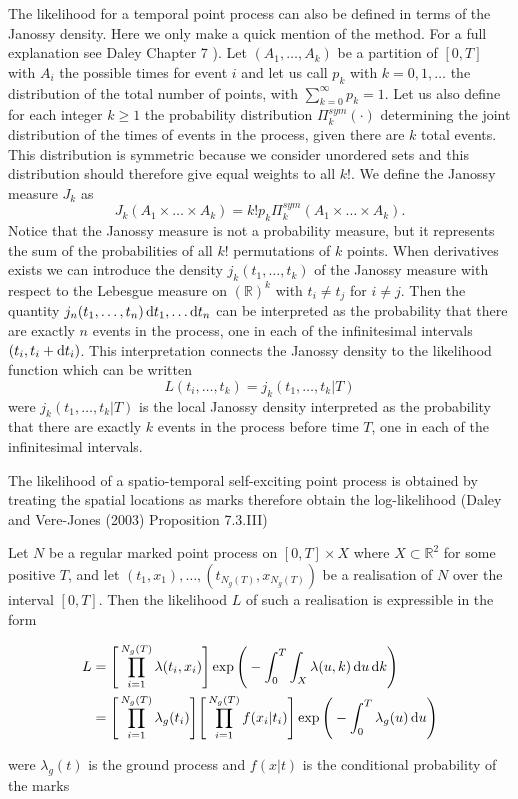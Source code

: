 The likelihood for a temporal point process can also be defined in terms of the Janossy density. Here we only make a quick mention of the method. For a full explanation see Daley Chapter 7 \cite{Daley}).
Let $(A_1, \dots, A_k)$ be a partition of $[0, T]$ with $A_i$ the possible times for event $i$ and let us call $p_k$ with $k = 0, 1, \dots$ the distribution of the total number of points, with $\sum_{k=0}^\infty p_k = 1$. Let us also define for each integer $k \geq 1$ the probability distribution $\Pi_k^{sym}(\cdot)$ determining the joint distribution of the times of events in the process, given there are $k$ total events. This distribution is symmetric because we consider unordered sets and this distribution should therefore give equal weights to all $k!$. We define the Janossy measure $J_k$ as
\begin{equation*}
    J_k(A_1 \times \dots \times A_k) = k!p_k\Pi_k^{sym}(A_1 \times \dots \times A_k).
\end{equation*}
Notice that the Janossy measure is not a probability measure, but it represents the sum of the probabilities of all $k!$ permutations of $k$ points. 
When derivatives exists we can introduce the density $j_k(t_1, \dots, t_k)$ of the Janossy measure with respect to the Lebesgue measure on $(\mathbb{R})^k$ with $t_i \neq t_j$ for $i \neq j$. Then the quantity $j_n(t_1, \dots, t_n)\operatorname{d}\!{t}_1, \dots \operatorname{d}\!{t}_n$ can be interpreted as the probability that there are exactly $n$ events in the process, one in each of the infinitesimal intervals $(t_i, t_i+\operatorname{d}\!{t}_i)$. This interpretation connects the Janossy density to the likelihood function which can be written
\begin{equation*}
    L(t_i,\dots, t_k) = j_k(t_1, \dots, t_k | T)
\end{equation*}
were $j_k(t_1, \dots, t_k | T)$ is the local Janossy density interpreted as the probability that there are exactly $k$ events in the process before time $T$, one in each of the infinitesimal intervals.

The likelihood of a spatio-temporal self-exciting point process is obtained by treating the spatial locations as marks therefore obtain the log-likelihood (Daley and Vere-Jones (2003) Proposition 7.3.III) \cite{Daley}

\begin{proposition}
    Let $N$ be a regular marked point process on $[0, T] \times X$ where $X \subset \mathbb{R}^2$ for some positive $T$, and let $(t_1, x_1), \dots, (t_{N_g(T)}, x_{N_g(T)})$ be a realisation of $N$ over the interval $[0, T]$. Then the likelihood $L$ of such a realisation is expressible  in the form
    
    \begin{align*}
        L &= \Bigg[ \prod_{i=1}^{N_g(T)} \lambda(t_i, x_i) \Bigg]\exp \Bigg( -\int_{0}^{T} \int_X \lambda(u, k) \operatorname{d}\!{u} \operatorname{d}\!{k} \Bigg) \\
        &= \Bigg[ \prod_{i=1}^{N_g(T)} \lambda_g(t_i) \Bigg] \Bigg[ \prod_{i=1}^{N_g(T)} f(x_i | t_i) \Bigg]\exp \Bigg( -\int_{0}^{T} \lambda_g(u) \operatorname{d}\!{u} \Bigg)
    \end{align*}
\end{proposition}
were $\lambda_g(t)$ is the ground process and $f(x | t)$ is the conditional probability of the marks 

